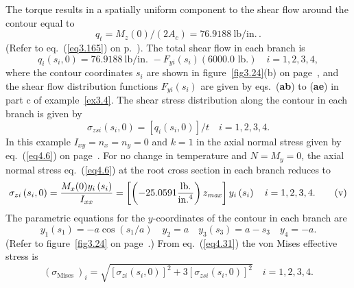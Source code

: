 \documentclass{AeroStructure-ERJohnson}
\begin{document}
\begin{example*}
\noindent The torque results in a spatially uniform component to the shear flow around the contour equal to
\begin{equation*}
q_{t}=M_{z}(0) /\left(2 A_{c}\right)=76.9188~\mathrm{lb} / \mathrm{in}.\,.\tag{s}
\end{equation*}
(Refer to eq.~(\ref{eq3.165}) on p.~\pageref{eq3.165}). The total shear flow in each branch is
\begin{equation*}
q_{i}\left(s_{i}, 0\right)=76.9188~\mathrm{lb}/\text{in. }-F_{y i}\left(s_{i}\right)(6000.0 \text { lb.}) \quad i=1,2,3,4,\tag{t}
\end{equation*}
where the contour coordinates $s_i$ are shown in figure~\ref{fig3.24}(b) on page~\pageref{fig3.24}, and the shear flow distribution functions $F_{y i}\left(s_{i}\right)$ are given by eqs.~(\textbf{ab}) to (\textbf{ae}) in part c of example~\ref{ex3.4}. The shear stress distribution along the contour in each branch is given by
\begin{equation*}
\sigma_{z s i}\left(s_{i}, 0\right)=[q_{i}(s_{i}, 0)] / t \quad i=1,2,3,4.\tag{u}
\end{equation*}
In this example $I_{x y}=n_{x}=n_{y}=0$ and $k=1$ in the axial normal stress given by eq.~(\ref{eq4.6}) on page~\pageref{eq4.6}. For no change in temperature and $N=M_{y}=0$, the axial normal stress eq.~(\ref{eq4.6}) at the root cross section in each branch reduces to
\begin{equation*}
\sigma_{z i}\left(s_{i}, 0\right)=\frac{M_{x}(0) y_{i}\left(s_{i}\right)}{I_{x x}}=\left[\left(-25.0591 \frac{\mathrm{lb} .}{\mathrm{in.}^{4}}\right) z_{\it max }\right] y_{i}\left(s_{i}\right) \quad i=1,2,3,4.\tag{v}
\end{equation*}
The parametric equations for the $y$-coordinates of the contour in each branch are
\begin{equation*}
y_{1}\left(s_{1}\right)=-a \cos \left(s_{1} / a\right) \quad y_{2}=a \quad y_{3}\left(s_{3}\right)=a-s_{3} \quad y_{4}=-a.
\tag{w}
\end{equation*}
(Refer to figure~\ref{fig3.24} on page~\pageref{fig3.24}.) From eq.~(\ref{eq4.31}) the von Mises effective stress is
\begin{equation*}
\left(\sigma_{\text {Mises }}\right)_{i}=\sqrt{\left[\sigma_{z i}\left(s_{i}, 0\right)\right]^{2}+3\left[\sigma_{z s i}\left(s_{i}, 0\right)\right]^{2}} \quad i=1,2,3,4.\tag{x}
\end{equation*}

\end{example*}
\end{document}
